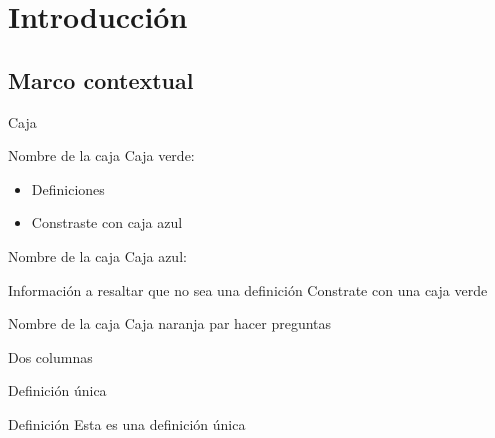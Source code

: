 \section{Introducción}

\subsection{Marco contextual}

\begin{frame}{Caja}
  \begin{Block}{Nombre de la caja}
    Caja verde:
    \begin{itemize}
      \item Definiciones
      \item Constraste con caja azul
    \end{itemize}
  \end{Block}
  \begin{BlueBlock}{Nombre de la caja}
    Caja azul:
    \begin{itemize}
      \bitem Información a resaltar que no sea una definición
      \bitem Constrate con una caja verde
    \end{itemize}
  \end{BlueBlock}
  \begin{AlertBlock}{Nombre de la caja}
    Caja naranja par hacer preguntas
  \end{AlertBlock} 
\end{frame}

\begin{frame}{Dos columnas}
  \begin{twocols}
  \end{twocols}
\end{frame}

\begin{frame}{Definición única}
  \centering
  \begin{singledef}{Definición}
    Esta es una definición única
  \end{singledef}
\end{frame}


